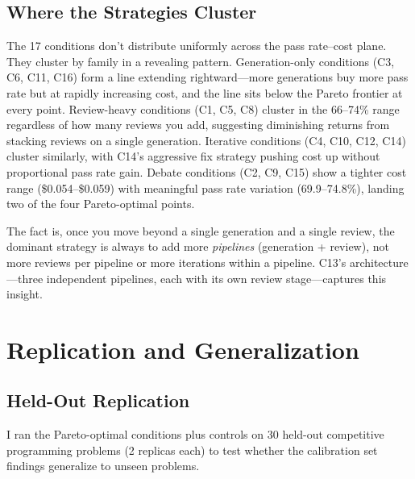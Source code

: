 \documentclass{article}
\begin{document}
\subsection{Where the Strategies Cluster}

The 17 conditions don't distribute uniformly across the pass rate--cost plane. They cluster by family in a revealing pattern. Generation-only conditions (C3, C6, C11, C16) form a line extending rightward---more generations buy more pass rate but at rapidly increasing cost, and the line sits below the Pareto frontier at every point. Review-heavy conditions (C1, C5, C8) cluster in the 66--74\% range regardless of how many reviews you add, suggesting diminishing returns from stacking reviews on a single generation. Iterative conditions (C4, C10, C12, C14) cluster similarly, with C14's aggressive fix strategy pushing cost up without proportional pass rate gain. Debate conditions (C2, C9, C15) show a tighter cost range (\$0.054--\$0.059) with meaningful pass rate variation (69.9--74.8\%), landing two of the four Pareto-optimal points.

The fact is, once you move beyond a single generation and a single review, the dominant strategy is always to add more \emph{pipelines} (generation + review), not more reviews per pipeline or more iterations within a pipeline. C13's architecture---three independent pipelines, each with its own review stage---captures this insight.

\section{Replication and Generalization}
\label{sec:replication}

\subsection{Held-Out Replication}

I ran the Pareto-optimal conditions plus controls on 30 held-out competitive programming problems (2 replicas each) to test whether the calibration set findings generalize to unseen problems.
\end{document}
